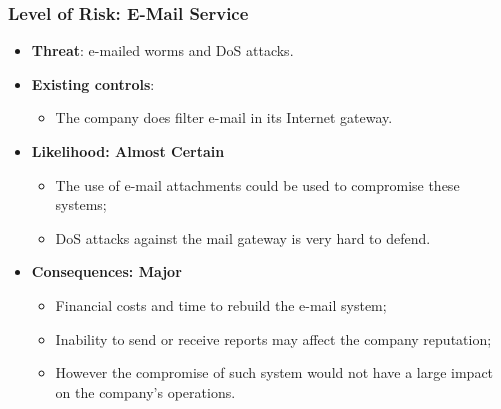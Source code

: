 \documentclass[xcolor ={table,usenames,dvipsnames}]{beamer}
\theoremstyle{definition}
\begin{document}
	\begin{frame}
		\frametitle{Level of Risk: E-Mail Service}
		\begin{itemize}
			\item \textbf{Threat}: e-mailed worms and DoS attacks.
			\item \textbf{Existing controls}: 
			\begin{itemize}
				\item The company does filter e-mail in its Internet gateway. 
			\end{itemize} 
			\item \textbf{Likelihood: Almost Certain}
			\begin{itemize}
				\item The use of e-mail attachments could be used to compromise these systems;
				\item DoS attacks against the mail gateway is very hard to defend.
			\end{itemize}	
			\item \textbf{Consequences: Major }
			\begin{itemize}
				\item Financial costs and time to rebuild the e-mail system;
				\item Inability to send or receive reports may affect the company reputation;
				\item However the compromise of such system would not have a large impact on the company's operations.
			\end{itemize}
		\end{itemize}
	\end{frame}
	
\end{document}
